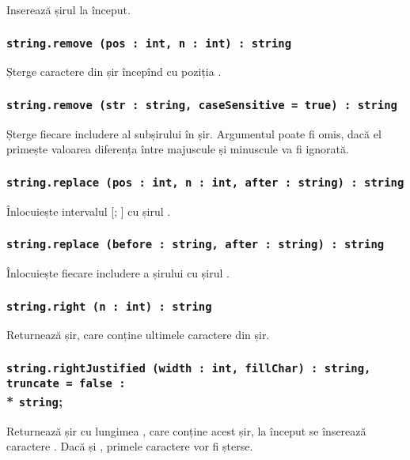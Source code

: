Inserează șirul  la început.

\subsubsection{\lstinline|string.remove (pos : int, n : int) : string|}

Șterge  caractere din șir începînd cu poziția .

\subsubsection{\lstinline|string.remove (str : string, caseSensitive = true) : string|}

Șterge fiecare includere al subșirului  în șir. Argumentul  poate fi omis, dacă el primește valoarea \false{} diferența între majuscule și minuscule va fi ignorată.

\subsubsection{\lstinline|string.replace (pos : int, n : int, after : string) : string|}

Înlocuiește intervalul [; ] cu șirul .

\subsubsection{\lstinline|string.replace (before : string, after : string) : string|}

Înlocuiește fiecare includere a șirului  cu șirul .

\subsubsection{\lstinline|string.right (n : int) : string|}

Returnează șir, care conține ultimele  caractere din șir.

\subsubsection{\lstinline|string.rightJustified (width : int, fillChar) : string, truncate = false :|\\* \lstinline|string|;}

Returnează șir cu lungimea , care conține acest șir, la început se înserează  caractere . Dacă  și , primele  caractere vor fi șterse.

